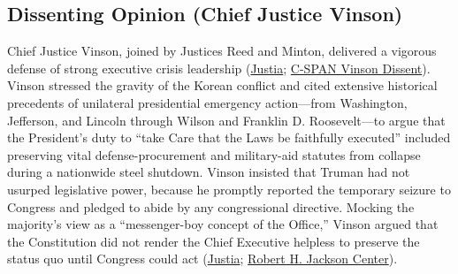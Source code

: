 \documentclass[12pt]{article}
\begin{document}
\subsection{Dissenting Opinion (Chief Justice Vinson)}
Chief Justice Vinson, joined by Justices Reed and Minton, delivered a vigorous defense of strong executive crisis leadership (\href{https://supreme.justia.com/cases/federal/us/343/579/}{Justia}; \href{https://static.c-span.org/landmarkCases/pdf/Youngstown_Vinson_Dissent.pdf}{C-SPAN Vinson Dissent}). Vinson stressed the gravity of the Korean conflict and cited extensive historical precedents of unilateral presidential emergency action---from Washington, Jefferson, and Lincoln through Wilson and Franklin D. Roosevelt---to argue that the President's duty to ``take Care that the Laws be faithfully executed'' included preserving vital defense-procurement and military-aid statutes from collapse during a nationwide steel shutdown. Vinson insisted that Truman had not usurped legislative power, because he promptly reported the temporary seizure to Congress and pledged to abide by any congressional directive. Mocking the majority's view as a ``messenger-boy concept of the Office,'' Vinson argued that the Constitution did not render the Chief Executive helpless to preserve the status quo until Congress could act (\href{https://supreme.justia.com/cases/federal/us/343/579/}{Justia}; \href{https://www.roberthjackson.org/wp-content/uploads/migrated-files/article-calendar-files/korman_primer.pdf}{Robert H. Jackson Center}).
\end{document}
